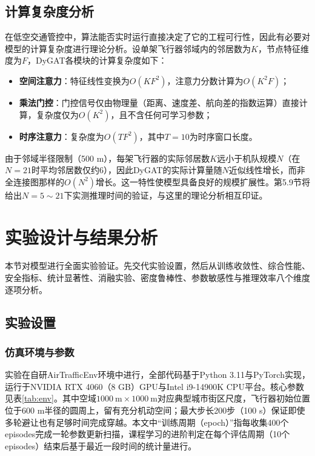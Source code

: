 \documentclass[12pt,a4paper,UTF8]{ctexart}
\begin{document}
\subsection{计算复杂度分析}

在低空交通管控中，算法能否实时运行直接决定了它的工程可行性，因此有必要对模型的计算复杂度进行理论分析。设单架飞行器邻域内的邻居数为$K$，节点特征维度为$F$，DyGAT各模块的计算复杂度如下：
\begin{itemize}
    \item \textbf{空间注意力}：特征线性变换为$O(KF^2)$，注意力分数计算为$O(K^2F)$；
    \item \textbf{乘法门控}：门控信号仅由物理量（距离、速度差、航向差的指数运算）直接计算，复杂度仅为$O(K^2)$，且不含任何可学习参数；
    \item \textbf{时序注意力}：复杂度为$O(TF^2)$，其中$T=10$为时序窗口长度。
\end{itemize}

由于邻域半径限制（500 m），每架飞行器的实际邻居数$K$远小于机队规模$N$（在$N=21$时平均邻居数仅约6），因此DyGAT的实际计算量随$N$近似线性增长，而非全连接图那样的$O(N^2)$增长。这一特性使模型具备良好的规模扩展性。第5.9节将给出$N=5\sim21$下实测推理时间的验证，与这里的理论分析相互印证。

\section{实验设计与结果分析}

本节对模型进行全面实验验证。先交代实验设置，然后从训练收敛性、综合性能、安全指标、统计显著性、消融实验、密度鲁棒性、参数敏感性与推理效率八个维度逐项分析。

\subsection{实验设置}

\subsubsection{仿真环境与参数}

实验在自研AirTrafficEnv环境中进行，全部代码基于Python 3.11与PyTorch实现，运行于NVIDIA RTX 4060（8 GB）GPU与Intel i9-14900K CPU平台。核心参数见表\ref{tab:env}。其中空域$1000\ \mathrm{m}\times1000\ \mathrm{m}$对应典型城市街区尺度，飞行器初始位置位于600 m半径的圆周上，留有充分机动空间；最大步长200步（100 s）保证即使多轮避让也有足够时间完成穿越。本文中“训练周期（epoch）”指每收集400个episodes完成一轮参数更新扫描，课程学习的进阶判定在每个评估周期（10个episodes）结束后基于最近一段时间的统计量进行。
\end{document}
